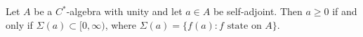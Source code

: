 Let $A$ be a $C^*$-algebra with unity and let $a \in A$ be self-adjoint. Then $a \geq 0$ if and only if $\Sigma(a) \subset [0, \infty)$, where $\Sigma(a) = \{f(a) : f \text{ state on } A\}$.
